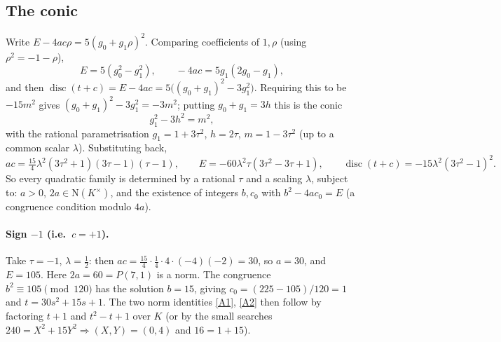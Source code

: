 \documentclass[11pt]{article}
\theoremstyle{remark}
\newcommand{\N}{\mathrm{N}}
\begin{document}
\subsection{The conic}
Write $E-4ac\rho=5(g_{0}+g_{1}\rho)^{2}$. Comparing coefficients of $1,\rho$ (using $\rho^{2}=-1-\rho$),
\[
E=5(g_{0}^{2}-g_{1}^{2}),\qquad -4ac=5g_{1}(2g_{0}-g_{1}),
\]
and then $\operatorname{disc}(t+c)=E-4ac=5\bigl((g_{0}+g_{1})^{2}-3g_{1}^{2}\bigr)$. Requiring this to be $-15m^{2}$
gives $(g_{0}+g_{1})^{2}-3g_{1}^{2}=-3m^{2}$; putting $g_{0}+g_{1}=3h$ this is the conic
\[
g_{1}^{2}-3h^{2}=m^{2},
\]
with the rational parametrisation $g_{1}=1+3\tau^{2}$, $h=2\tau$, $m=1-3\tau^{2}$ (up to a common scalar $\lambda$).
Substituting back,
\begin{equation}\label{eq:param}
ac=\tfrac{15}{4}\lambda^{2}(3\tau^{2}+1)(3\tau-1)(\tau-1),\qquad
E=-60\lambda^{2}\tau(3\tau^{2}-3\tau+1),\qquad
\operatorname{disc}(t+c)=-15\lambda^{2}(3\tau^{2}-1)^{2}.
\end{equation}
So every quadratic family is determined by a rational $\tau$ and a scaling $\lambda$, subject to:
$a>0$, $2a\in\N(K^{\times})$, and the existence of integers $b,c_{0}$ with $b^{2}-4ac_{0}=E$
(a congruence condition modulo $4a$).

\paragraph{Sign $-1$ (i.e.\ $c=+1$).}
Take $\tau=-1$, $\lambda=\tfrac12$: then $ac=\tfrac{15}{4}\cdot\tfrac14\cdot4\cdot(-4)(-2)=30$, so $a=30$, and $E=105$.
Here $2a=60=P(7,1)$ is a norm. The congruence $b^{2}\equiv105\pmod{120}$ has the solution $b=15$, giving
$c_{0}=(225-105)/120=1$ and $t=30s^{2}+15s+1$. The two norm identities \eqref{A1}, \eqref{A2} then follow
by factoring $t+1$ and $t^{2}-t+1$ over $K$ (or by the small searches
$240=X^{2}+15Y^{2}\Rightarrow(X,Y)=(0,4)$ and $16=1+15$).
\end{document}
